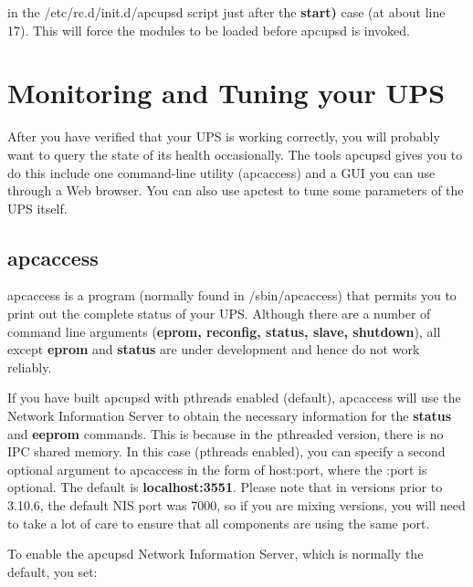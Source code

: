 {{{{\begin{itemize}
in the /etc/rc.d/init.d/apcupsd script just after the {\bf start)} case (at
about line 17). This will force the modules to be loaded before apcupsd is
invoked. 
\end{itemize}

\label{Monitoring-and-Tuning-your-UPS}

\section*{Monitoring and Tuning your UPS}

\label{index-Monitoring-109}
\label{index-Tuning-110}
After you have verified that your UPS is working correctly, you will probably
want to query the state of its health occasionally. The tools apcupsd gives
you to do this include one command-line utility (apcaccess) and a GUI you can
use through a Web browser.  You can also use apctest to tune some parameters
of the UPS itself. 

\label{apcaccess}

\subsection*{apcaccess}

\label{index-apcaccess-111}
apcaccess is a program (normally found in /sbin/apcaccess) that permits you to
print out the complete status of your UPS. Although there are a number of
command line arguments ({\bf eprom, reconfig, status, slave, shutdown}), all
except {\bf eprom} and {\bf status} are under development and hence do not
work reliably.  

If you have built apcupsd with pthreads enabled (default), apcaccess will use
the Network Information Server to obtain the necessary information for the
{\bf status} and {\bf eeprom} commands. This is because in the pthreaded
version, there is no IPC shared memory. In this case (pthreads enabled), you
can specify a second optional argument to apcaccess in the form of host:port,
where the :port is optional. The default is {\bf localhost:3551}. Please note
that in versions prior to 3.10.6, the default NIS port was 7000, so if you are
mixing versions, you will need to take a lot of care to ensure that all
components are using the same port.  

To enable the apcupsd Network Information Server, which is normally the
default, you set: 

}}}}

